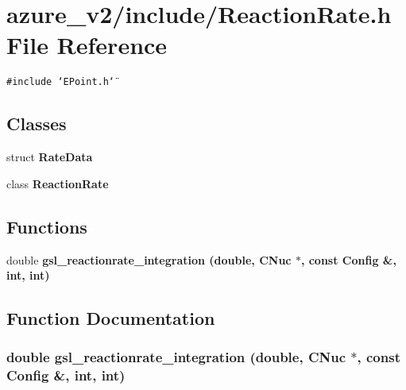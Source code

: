 \section{azure\_\-v2/include/Reaction\-Rate.h File Reference}
\label{ReactionRate_8h}
{\tt \#include \char`\"{}EPoint.h\char`\"{}}\par
\subsection*{Classes}
\begin{CompactItemize}
\item 
struct \bf{Rate\-Data}
\item 
class \bf{Reaction\-Rate}
\end{CompactItemize}
\subsection*{Functions}
\begin{CompactItemize}
\item 
double \bf{gsl\_\-reactionrate\_\-integration} (double, \bf{CNuc} $\ast$, const \bf{Config} \&, int, int)
\end{CompactItemize}


\subsection{Function Documentation}
\subsubsection{\setlength{\rightskip}{0pt plus 5cm}double gsl\_\-reactionrate\_\-integration (double, \bf{CNuc} $\ast$, const \bf{Config} \&, int, int)}\label{ReactionRate_8h_f4b03a26902a7751eb0248d95d5af195}


